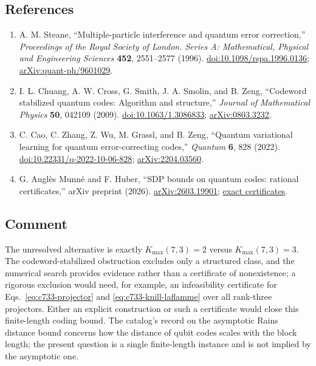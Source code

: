 \subsection*{References}

\begin{enumerate}[label={},leftmargin=4.8em,labelsep=0.5em]
  \footnotesize
  \item[\textup{[Ste96]}]\label{ref:c733-steane}
  A. M. Steane, ``Multiple-particle interference and quantum error
correction,'' \emph{Proceedings of the Royal Society of London. Series A:
Mathematical, Physical and Engineering Sciences} \textbf{452}, 2551--2577
(1996).
\href{https://doi.org/10.1098/rspa.1996.0136}{doi:10.1098/rspa.1996.0136};
\href{https://arxiv.org/abs/quant-ph/9601029}{arXiv:quant-ph/9601029}.

  \item[\textup{[CCSSZ09]}]\label{ref:c733-chuang}
  I. L. Chuang, A. W. Cross, G. Smith, J. A. Smolin, and B. Zeng, ``Codeword
stabilized quantum codes: Algorithm and structure,'' \emph{Journal of
Mathematical Physics} \textbf{50}, 042109 (2009).
\href{https://doi.org/10.1063/1.3086833}{doi:10.1063/1.3086833};
\href{https://arxiv.org/abs/0803.3232}{arXiv:0803.3232}.

  \item[\textup{[CZWGZ22]}]\label{ref:c733-cao}
  C. Cao, C. Zhang, Z. Wu, M. Grassl, and B. Zeng, ``Quantum variational
learning for quantum error-correcting codes,'' \emph{Quantum} \textbf{6},
828 (2022).
\href{https://doi.org/10.22331/q-2022-10-06-828}{doi:10.22331/q-2022-10-06-828};
\href{https://arxiv.org/abs/2204.03560}{arXiv:2204.03560}.

  \item[\textup{[AMH26]}]\label{ref:c733-angles-huber}
  G. Angl\`es Munn\'e and F. Huber, ``SDP bounds on quantum codes: rational certificates,'' arXiv preprint (2026). \href{https://arxiv.org/abs/2603.19901}{arXiv:2603.19901}; \href{https://github.com/ganglesmunne/SDP_bounds_on_quantum_codes_rational_certificates}{exact certificates}.
\end{enumerate}

\subsection*{Comment}

The unresolved alternative is exactly $K_{\max}(7,3)=2$ versus
$K_{\max}(7,3)=3$.  The codeword-stabilized obstruction excludes only a
structured class, and the numerical search provides evidence rather than a
certificate of nonexistence; a rigorous exclusion would need, for example,
an infeasibility certificate for Eqs.~\eqref{eq:c733-projector} and
\eqref{eq:c733-knill-laflamme} over all rank-three projectors.  Either an
explicit construction or such a certificate would close this finite-length
coding bound.  The catalog's record on the asymptotic Rains distance bound
concerns how the distance of qubit codes scales with the block length; the
present question is a single finite-length instance and is not implied by
the asymptotic one.

